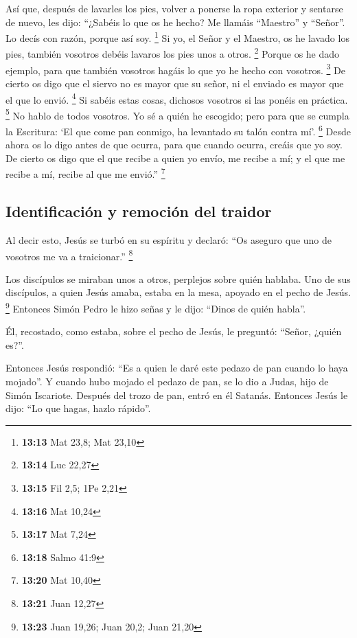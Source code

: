 \begin{paracol}{2}
 Así que, después de lavarles los pies, volver a ponerse
la ropa exterior y sentarse de nuevo, les dijo: ``¿Sabéis lo que os he
hecho?  Me llamáis ``Maestro'' y ``Señor''. Lo decís con
razón, porque así soy. \footnote{\textbf{13:13} Mat 23,8; Mat 23,10}
 Si yo, el Señor y el Maestro, os he lavado los pies,
también vosotros debéis lavaros los pies unos a otros. \footnote{\textbf{13:14}
  Luc 22,27}  Porque os he dado ejemplo, para que también
vosotros hagáis lo que yo he hecho con vosotros. \footnote{\textbf{13:15}
  Fil 2,5; 1Pe 2,21}  De cierto os digo que el siervo no
es mayor que su señor, ni el enviado es mayor que el que lo envió.
\footnote{\textbf{13:16} Mat 10,24}  Si sabéis estas
cosas, dichosos vosotros si las ponéis en práctica. \footnote{\textbf{13:17}
  Mat 7,24}  No hablo de todos vosotros. Yo sé a quién he
escogido; pero para que se cumpla la Escritura: `El que come pan
conmigo, ha levantado su talón contra mí'. \footnote{\textbf{13:18}
  Salmo 41:9}  Desde ahora os lo digo antes de que
ocurra, para que cuando ocurra, creáis que yo soy.  De
cierto os digo que el que recibe a quien yo envío, me recibe a mí; y el
que me recibe a mí, recibe al que me envió.'' \footnote{\textbf{13:20}
  Mat 10,40}

\hypertarget{identificaciuxf3n-y-remociuxf3n-del-traidor}{%
\subsection{Identificación y remoción del
traidor}\label{identificaciuxf3n-y-remociuxf3n-del-traidor}}

 Al decir esto, Jesús se turbó en su espíritu y declaró:
``Os aseguro que uno de vosotros me va a traicionar.'' \footnote{\textbf{13:21}
  Juan 12,27}

 Los discípulos se miraban unos a otros, perplejos sobre
quién hablaba.  Uno de sus discípulos, a quien Jesús
amaba, estaba en la mesa, apoyado en el pecho de Jesús. \footnote{\textbf{13:23}
  Juan 19,26; Juan 20,2; Juan 21,20}  Entonces Simón
Pedro le hizo señas y le dijo: ``Dinos de quién habla''.

 Él, recostado, como estaba, sobre el pecho de Jesús, le
preguntó: ``Señor, ¿quién es?''.

 Entonces Jesús respondió: ``Es a quien le daré este
pedazo de pan cuando lo haya mojado''. Y cuando hubo mojado el pedazo de
pan, se lo dio a Judas, hijo de Simón Iscariote.  Después
del trozo de pan, entró en él Satanás. Entonces Jesús le dijo: ``Lo que
hagas, hazlo rápido''.


\end{paracol}
